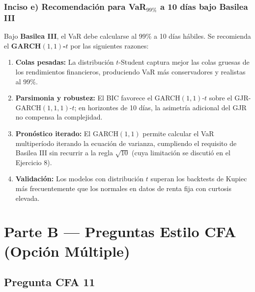 \documentclass[12pt,a4paper]{article}
\begin{document}
\subsubsection*{Inciso e) Recomendación para VaR$_{99\%}$ a 10 días bajo Basilea III}

\begin{solucion}
Bajo \textbf{Basilea III}, el VaR debe calcularse al 99\% a 10 días hábiles. Se recomienda el \textbf{GARCH$(1,1)$-$t$} por las siguientes razones:
\begin{enumerate}[noitemsep]
  \item \textbf{Colas pesadas:} La distribución $t$-Student captura mejor las colas gruesas de los rendimientos financieros, produciendo VaR más conservadores y realistas al 99\%.
  \item \textbf{Parsimonia y robustez:} El BIC favorece el GARCH$(1,1)$-$t$ sobre el GJR-GARCH$(1,1,1)$-$t$; en horizontes de 10 días, la asimetría adicional del GJR no compensa la complejidad.
  \item \textbf{Pronóstico iterado:} El GARCH$(1,1)$ permite calcular el VaR multiperíodo iterando la ecuación de varianza, cumpliendo el requisito de Basilea III sin recurrir a la regla $\sqrt{10}$ (cuya limitación se discutió en el Ejercicio 8).
  \item \textbf{Validación:} Los modelos con distribución $t$ superan los backtests de Kupiec más frecuentemente que los normales en datos de renta fija con curtosis elevada.
\end{enumerate}
\end{solucion}

\clearpage
\section{Parte B — Preguntas Estilo CFA (Opción Múltiple)}

\subsection*{Pregunta CFA 11}
\end{document}
